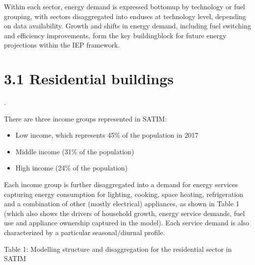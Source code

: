 \documentclass[letterpaper,10pt,english]{jupyterBook}
\begin{document}
\sphinxAtStartPar
Within each sector, energy demand is expressed bottom\sphinxhyphen{}up by technology or fuel grouping, with sectors disaggregated into end\sphinxhyphen{}uses at technology level, depending on data availability. Growth and shifts in energy demand, including fuel switching and efficiency improvements, form the key building\sphinxhyphen{}block for future energy projections within the IEP framework.


\section{3.1 Residential buildings}
\label{\detokenize{03Energydemand:residential-buildings}}
\sphinxAtStartPar
{}.

\sphinxAtStartPar
There are three income groups represented in SATIM:
\begin{itemize}
\item {} 
\sphinxAtStartPar
Low income, which represents 45\% of the population in 2017

\item {} 
\sphinxAtStartPar
Middle income (31\% of the population)

\item {} 
\sphinxAtStartPar
High income (24\% of the population)

\end{itemize}

\sphinxAtStartPar
Each income group is further disaggregated into a demand for energy services capturing energy consumption for lighting, cooking, space heating, refrigeration and a combination of other (mostly electrical) appliances, as shown in Table 1 (which also shows the drivers of household growth, energy service demands, fuel use and appliance ownership captured in the model). Each service demand is also characterized by a particular seasonal/diurnal profile.

\sphinxAtStartPar
Table 1: Modelling structure and disaggregation for the residential sector in SATIM
\end{document}
